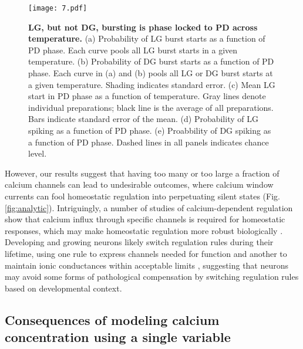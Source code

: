 \documentclass[9pt,lineno]{elife}
\begin{document}
\begin{figure}[!htp]
\centering
\begin{fullwidth}
\texttt{[image: 7.pdf]}
\end{fullwidth}
\caption{\textbf{LG, but not DG, bursting is phase locked to PD across temperature.} (a) Probability of LG burst starts as a function of PD phase. Each curve pools all LG burst starts in a given temperature.  (b) Probability of DG burst starts as a function of PD phase. Each curve in (a) and (b) pools all LG or DG burst starts at a given temperature. Shading indicates standard error.  (c) Mean LG start in PD phase as a function of temperature. Gray lines denote individual preparations; black line is the average of all preparations. Bars indicate standard error of the mean. (d) Probability of LG spiking as a function of PD phase. (e) Proabbility of DG spiking as a function of PD phase.  Dashed lines in all panels indicates chance level.}
\end{figure}


However, our results suggest that having too many or too large a fraction of calcium channels can lead to undesirable outcomes, where calcium window currents can fool homeostatic regulation into perpetuating silent states (Fig. \ref{fig:analytic}). Intriguingly, a number of studies of calcium-dependent regulation show that calcium influx through specific channels is required for homeostatic responses, which may make homeostatic regulation more robust biologically \citep{OLeary:2010hq,wheeler2012cav1}. Developing and growing neurons likely switch regulation rules during their lifetime, using one rule to express channels needed for function and another to maintain ionic conductances within acceptable limits  \citep{Desai:1999ib}, suggesting that neurons may avoid some forms of pathological compensation by switching regulation rules based on developmental context. 


\subsection{Consequences of modeling calcium concentration using a single variable}
\end{document}
